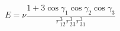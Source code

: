 \documentclass[12pt]{article}
\begin{document}
\begin{equation}
E=\nu\frac{1+3\cos\gamma_1\cos\gamma_2\cos\gamma_3}{r_{12}^3r_{23}^3r_{31}^3}
\end{equation}
\end{document}
